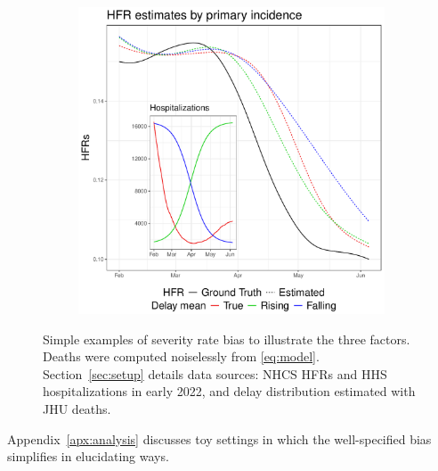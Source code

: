 \documentclass{article}
\renewcommand{\hat}{\widehat} %
\DeclareMathOperator{\bias}{Bias}
\begin{document}
\begin{figure}
\begin{subfigure}[b]{0.32\linewidth}
         \caption{}
         \label{fig:toy_delay}
     \end{subfigure}
     \begin{subfigure}[b]{0.32\linewidth}
         \centering
         \includegraphics[width=\linewidth]{Figs/Simulated/toy_chging_primary.pdf}
         \caption{}
         \label{fig:toy_primary}
     \end{subfigure}
        \caption{Simple examples of severity rate bias to illustrate the three
        factors. Deaths were computed noiselessly from \eqref{eq:model}.
        Section~\ref{sec:setup} details data sources: 
        NHCS HFRs and HHS hospitalizations in early 2022,
        and delay distribution estimated with JHU deaths.}
        \label{fig:bias_ex_main}
\end{figure}



Appendix~\ref{apx:analysis} discusses toy settings in which the well-specified bias simplifies in elucidating ways.
\end{document}
